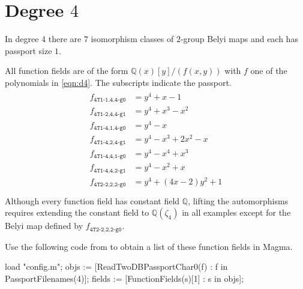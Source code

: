 \documentclass{dcthesis}
\newcommand{\QQ}{\mathbb Q}
\numberwithin{equation}{section}
\theoremstyle{definition}
\theoremstyle{remark}
\begin{document}
{{  \section{Degree $4$}{
    \label{sec:d4}
    In degree $4$ there are $7$
    isomorphism classes of
    $2$-group Belyi maps
    and each has
    passport size $1$.
    \par
    All function fields are of the form
    $\QQ(x)[y]/(f(x,y))$
    with $f$ one of the polynomials in
    \eqref{eqn:d4}.
    The subscripts indicate the passport.
    \begin{align}
      \label{eqn:d4}
      \begin{split}
        f_{\texttt{4T1-1,4,4-g0}}
        &= y^4 + x - 1\\
        f_{\texttt{4T1-2,4,4-g1}}
        &= y^4 + x^3 - x^2\\
        f_{\texttt{4T1-4,1,4-g0}}
        &= y^4 - x\\
        f_{\texttt{4T1-4,2,4-g1}}
        &= y^4 - x^3 + 2x^2 - x\\
        f_{\texttt{4T1-4,4,1-g0}}
        &= y^4 - x^4 + x^3\\
        f_{\texttt{4T1-4,4,2-g1}}
        &= y^4 - x^2 + x\\
        f_{\texttt{4T2-2,2,2-g0}}
        &= y^4 + (4x - 2)y^2 + 1\\
      \end{split}
    \end{align}
    Although every function field has
    constant field $\QQ$,
    lifting the automorphisms
    requires extending the constant
    field to $\QQ(\zeta_{4})$
    in all examples except for the
    Belyi map defined by
    $f_{\texttt{4T2-2,2,2-g0}}$.
    \par
    Use the following code from
    \cite{twogroupdessins}
    to obtain a list of these
    function fields in \textsf{Magma}.
    \begin{magma}
load "config.m";
objs := [ReadTwoDBPassportChar0(f) : f in PassportFilenames(4)];
fields := [FunctionFields(s)[1] : s in objs];
    \end{magma}
  }
}}
\end{document}
